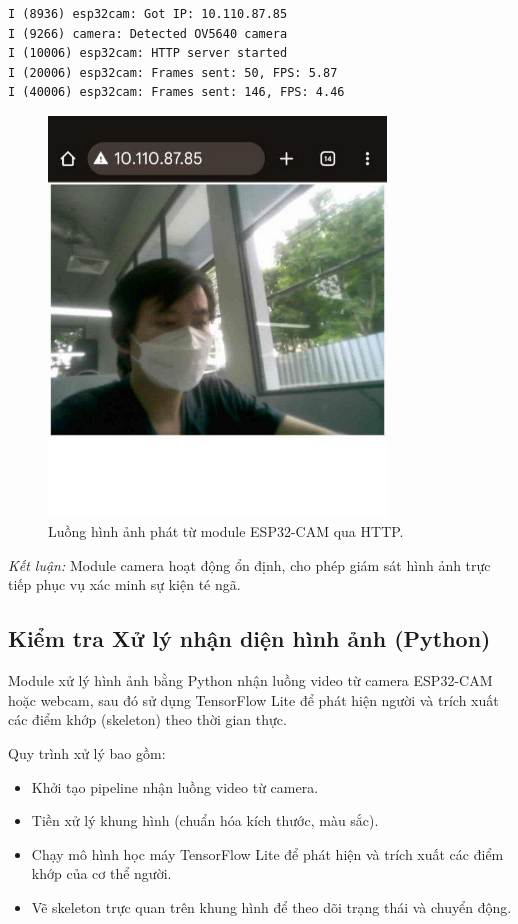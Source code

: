 \begin{verbatim}
I (8936) esp32cam: Got IP: 10.110.87.85
I (9266) camera: Detected OV5640 camera
I (10006) esp32cam: HTTP server started
I (20006) esp32cam: Frames sent: 50, FPS: 5.87
I (40006) esp32cam: Frames sent: 146, FPS: 4.46
\end{verbatim}

\begin{figure}[H]
    \centering
    \includegraphics[width=0.8\textwidth]{figures/module2_stream_example.jpg}
    \caption{Luồng hình ảnh phát từ module ESP32-CAM qua HTTP.}
    \label{fig:camera_stream}
\end{figure}

\textit{Kết luận:} Module camera hoạt động ổn định, cho phép giám sát hình ảnh trực tiếp phục vụ xác minh sự kiện té ngã.

\subsection{Kiểm tra Xử lý nhận diện hình ảnh (Python)}
Module xử lý hình ảnh bằng Python nhận luồng video từ camera ESP32-CAM hoặc webcam, sau đó sử dụng TensorFlow Lite để phát hiện người và trích xuất các điểm khớp (skeleton) theo thời gian thực.  

Quy trình xử lý bao gồm:
\begin{itemize}
    \item Khởi tạo pipeline nhận luồng video từ camera.  
    \item Tiền xử lý khung hình (chuẩn hóa kích thước, màu sắc).  
    \item Chạy mô hình học máy TensorFlow Lite để phát hiện và trích xuất các điểm khớp của cơ thể người.  
    \item Vẽ skeleton trực quan trên khung hình để theo dõi trạng thái và chuyển động.  
\end{itemize}

